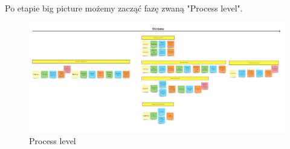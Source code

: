 \documentclass{article}
\begin{document}
      Po etapie big picture możemy zacząć fazę zwaną "Process level". 
      \begin{figure}
            \centering
            \includegraphics[width=0.9\linewidth]{ProcessLevel.jpg}
            \caption{Process level}
      \end{figure}

\newpage
\end{document}
